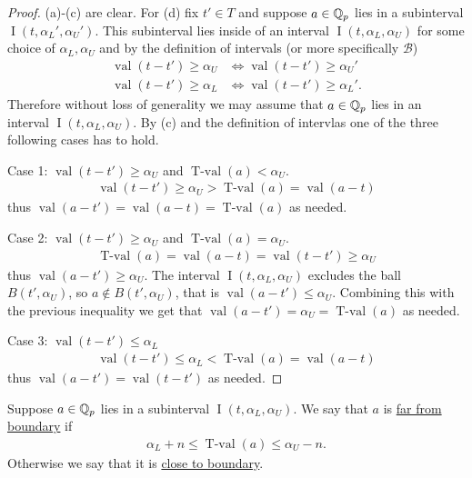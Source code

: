 \documentclass{amsart}
\newcommand{\BB}{\mathscr B}
\DeclareMathOperator{\val}{val}
\DeclareMathOperator{\vval}{val}
\DeclareMathOperator{\tval}{T-val}
\DeclareMathOperator{\inti}{I}
\newcommand{\defn}{\underline}
\newcommand{\interval}{\inti(t, \alpha_L, \alpha_U)}
\begin{document}
\begin{proof}
  (a)-(c) are clear.
  For (d) fix $t' \in T$ and suppose $a \in \mathbb{Q}_p$ lies in a subinterval $\inti(t, \alpha_L', \alpha_U')$.
  This  subinterval lies inside of an interval $\interval$ for some choice of $\alpha_L, \alpha_U$ and
  by the definition of intervals (or more specifically $\BB$)
  \begin{align*}
    \vval(t - t') \geq \alpha_U &\iff \vval(t - t') \geq \alpha_U'\\
    \vval(t - t') \geq \alpha_L &\iff \vval(t - t') \geq \alpha_L'.
  \end{align*}
  Therefore without loss of generality we may assume that $a \in \mathbb{Q}_p$ lies in an interval $\interval$.
  By (c) and the definition of intervlas one of the three following cases has to hold.
  
  Case 1: $\vval(t - t') \geq \alpha_U$ and $\tval(a) < \alpha_U$.
  \begin{align*}
    \vval(t - t') \geq \alpha_U > \tval(a) = \vval(a - t)
  \end{align*}
  thus $\vval(a - t') = \vval(a - t) = \tval(a)$ as needed.

  Case 2: $\vval(t - t') \geq \alpha_U$ and $\tval(a) = \alpha_U$.
  \begin{align*}
    \tval(a) = \vval(a - t) = \vval(t - t') \geq \alpha_U
  \end{align*}
  thus $\vval(a - t') \geq \alpha_U$.
  The interval $\interval$ excludes the ball $B(t', \alpha_U)$,
  so $a \notin B(t', \alpha_U)$, that is $\val(a - t') \leq \alpha_U$.
  Combining this with the previous inequality we get that $\val(a - t') = \alpha_U = \tval(a)$ as needed.

  Case 3: $\vval(t - t') \leq \alpha_L$
  \begin{align*}
    \vval(t - t') \leq \alpha_L < \tval(a) = \vval(a - t)
  \end{align*}
  thus $\vval(a - t') = \vval(t - t')$ as needed. 
\end{proof}




\begin{Definition}
  Suppose $a \in \mathbb{Q}_p$ lies in a subinterval $\interval$.
  We say that $a$ is \defn{far from boundary} if 
    \begin{align*}
	\alpha_L + n \leq \tval(a) \leq \alpha_U - n.
    \end{align*}
  Otherwise we say that it is \defn{close to boundary}.
\end{Definition}
\end{document}
